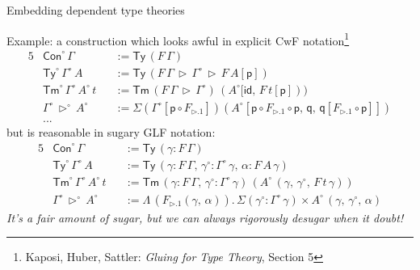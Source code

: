 \documentclass[dvipsnames,aspectratio=169]{beamer}
\newcommand{\ms}[1]{\mathsf{#1}}
\newcommand{\bs}[1]{\boldsymbol{#1}}
\newcommand{\id}{\mathsf{id}}
\newcommand{\Con}{\mathsf{Con}}
\newcommand{\Tm}{\mathsf{Tm}}
\newcommand{\Ty}{\mathsf{Ty}}
\newcommand{\Y}{\mathsf{Y}}
\newcommand{\ext}{\triangleright}
\begin{document}

\begin{frame}{Embedding dependent type theories}

Example: a construction which looks awful in explicit CwF notation\footnote{Kaposi, Huber, Sattler: \emph{Gluing for Type Theory}, Section 5}
{\small
\begin{alignat*}{5}
  &\Con^{\circ}\,\Gamma && := \Ty\,(F\,\Gamma)\\
  &\Ty^{\circ}\,\Gamma^{\circ}\,A && := \Ty\,(F\,\Gamma\,\ext\,\Gamma^{\circ}\,\ext\,F\,A[\ms{p}])\\
  &\Tm^{\circ}\,\Gamma^{\circ}\,A^{\circ}\,t && := \Tm\,(F\,\Gamma\,\ext\,\Gamma^{\circ})\,(A^{\circ}[\id,\,F\,t[\ms{p}]))\\
  & \Gamma^{\circ}\,\ext^{\circ}\,A^{\circ} && := \Sigma(\Gamma^{\circ}[\ms{p}\circ F_{\ext.1}])(A^{\circ}[\ms{p} \circ F_{\ext.1} \circ \ms{p},\,\ms{q},\,\ms{q}[F_{\ext.1} \circ \ms{p}]])\\
  & ... &&
\end{alignat*}
\vspace{-0.5em}
{\normalsize but is reasonable in sugary GLF notation:}
\begin{alignat*}{5}
  &\Con^{\circ}\,\Gamma && := \Ty\,(\gamma : F\,\Gamma)\\
  &\Ty^{\circ}\,\Gamma^{\circ}\,A && := \Ty\,(\gamma : F\,\Gamma,\,\gamma^{\circ} : \Gamma^{\circ}\,\gamma,\,\alpha : F\,A\,\gamma)\\
  &\Tm^{\circ}\,\Gamma^{\circ}\,A^{\circ}\,t && := \Tm\,(\gamma : F\,\Gamma,\,\gamma^{\circ} : \Gamma^{\circ}\,\gamma)\,(A^{\circ}\,(\gamma,\,\gamma^{\circ},\,F\,t\,\gamma))\\
  & \Gamma^{\circ}\,\ext^{\circ}\,A^{\circ} &&:= \Lambda\,(F_{\ext.1}(\gamma,\,\alpha)).\, \Sigma(\gamma^{\circ} : \Gamma^{\circ}\,\gamma) \times A^{\circ}\,(\gamma,\,\gamma^{\circ},\,\alpha)
\end{alignat*}
}
\emph{It's a fair amount of sugar, but we can always rigorously desugar when it doubt!}

\end{frame}
\end{document}
